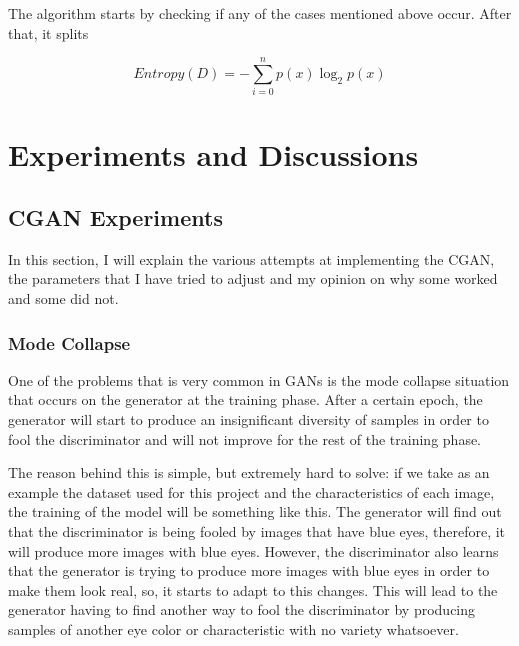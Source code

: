 \documentclass[12pt,a4paper,oneside]{memoir}
\begin{document}
The algorithm starts by checking if any of the cases mentioned above occur. After that, it splits 

\begin{equation}   
    Entropy(D) = -\sum\limits_{i=0}^{n}p(x)\log_2 p(x)
    \label{eq:entropy}
\end{equation}






\clearpage{\thispagestyle{empty}\cleardoublepage}

\chapter{Experiments and Discussions}


\section{\acs{CGAN} Experiments}
In this section, I will explain the various attempts at implementing the \acs{CGAN}, the parameters that I have tried to adjust and my opinion on why some worked and some did not.


\subsection{Mode Collapse}
One of the problems that is very common in \acs{GAN}s is the mode collapse situation that occurs on the generator at the training phase. After a certain epoch, the generator will start to produce an insignificant diversity of samples in order to fool the discriminator and will not improve for the rest of the training phase.

\par

The reason behind this is simple, but extremely hard to solve: if we take as an example the dataset used for this project and the characteristics of each image, the training of the model will be something like this. The generator will find out that the discriminator is being fooled by images that have blue eyes, therefore, it will produce more images with blue eyes. However, the discriminator also learns that the generator is trying to produce more images with blue eyes in order to make them look real, so, it starts to adapt to this changes. This will lead to the generator having to find another way to fool the discriminator by producing samples of another eye color or characteristic with no variety whatsoever.
\end{document}
